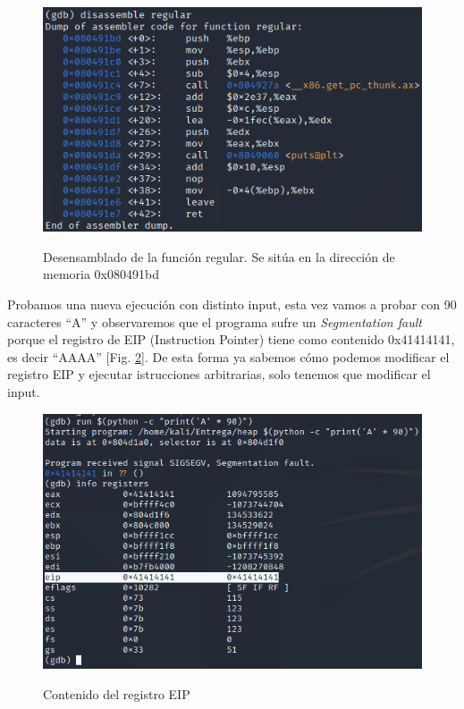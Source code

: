 \documentclass[10pt,a4paper]{article}
\begin{document}
\begin{figure}[h!]
  \centering
  \includegraphics[scale=0.5]{3.1.png}\\
  \caption{Desensamblado de la función regular. Se sitúa en la dirección de memoria 0x080491bd}
  \label{fig:figura4}
\end{figure}

\pagebreak

Probamos una nueva ejecución con distinto input, esta vez vamos a probar con 90 caracteres ``A'' y observaremos  que el programa sufre un \textit{Segmentation fault} porque el registro de EIP (Instruction Pointer) tiene como contenido 0x41414141, es decir ``AAAA'' [Fig. \ref{fig:figura5}]. De esta forma ya sabemos cómo podemos modificar el registro EIP y ejecutar istrucciones arbitrarias, solo tenemos que modificar el input.
\begin{figure}[h!]
  \centering
  \includegraphics[scale=0.5]{4.png}\\
  \caption{Contenido del registro EIP}
  \label{fig:figura5}
\end{figure}
\end{document}
